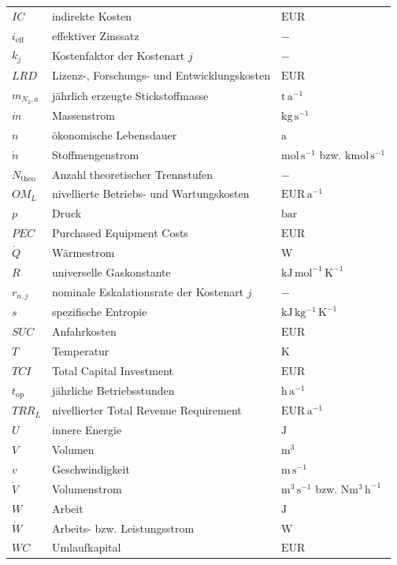 \begin{longtable}{p{3cm}p{8cm}p{3cm}}
$IC$ & indirekte Kosten & $\mathrm{EUR}$ \\
$i_\mathrm{eff}$ & effektiver Zinssatz & $-$ \\
$k_j$ & Kostenfaktor der Kostenart $j$ & $-$ \\
$LRD$ & Lizenz-, Forschungs- und Entwicklungskosten & $\mathrm{EUR}$ \\
$m_{N_2,a}$ & jährlich erzeugte Stickstoffmasse & $\mathrm{t\,a^{-1}}$ \\
$\dot{m}$ & Massenstrom & $\mathrm{kg\,s^{-1}}$ \\
$n$ & ökonomische Lebensdauer & $\mathrm{a}$ \\
$\dot{n}$ & Stoffmengenstrom & $\mathrm{mol\,s^{-1}}$ bzw. $\mathrm{kmol\,s^{-1}}$ \\
$N_\mathrm{theo}$ & Anzahl theoretischer Trennstufen & $-$ \\
$OM_L$ & nivellierte Betriebs- und Wartungskosten & $\mathrm{EUR\,a^{-1}}$ \\
$p$ & Druck & $\mathrm{bar}$ \\
$PEC$ & Purchased Equipment Costs & $\mathrm{EUR}$ \\
$\dot{Q}$ & Wärmestrom & $\mathrm{W}$ \\
$R$ & universelle Gaskonstante & $\mathrm{kJ\,mol^{-1}\,K^{-1}}$ \\
$r_{n,j}$ & nominale Eskalationsrate der Kostenart $j$ & $-$ \\
$s$ & spezifische Entropie & $\mathrm{kJ\,kg^{-1}\,K^{-1}}$ \\
$SUC$ & Anfahrkosten & $\mathrm{EUR}$ \\
$T$ & Temperatur & $\mathrm{K}$ \\
$TCI$ & Total Capital Investment & $\mathrm{EUR}$ \\
$t_\mathrm{op}$ & jährliche Betriebsstunden & $\mathrm{h\,a^{-1}}$ \\
$TRR_L$ & nivellierter Total Revenue Requirement & $\mathrm{EUR\,a^{-1}}$ \\
$U$ & innere Energie & $\mathrm{J}$ \\
$V$ & Volumen & $\mathrm{m^3}$ \\
$v$ & Geschwindigkeit & $\mathrm{m\,s^{-1}}$ \\
$\dot{V}$ & Volumenstrom & $\mathrm{m^3\,s^{-1}}$ bzw. $\mathrm{Nm^3\,h^{-1}}$ \\
$W$ & Arbeit & $\mathrm{J}$ \\
$\dot{W}$ & Arbeits- bzw. Leistungsstrom & $\mathrm{W}$ \\
$WC$ & Umlaufkapital & $\mathrm{EUR}$ \\

\end{longtable}
